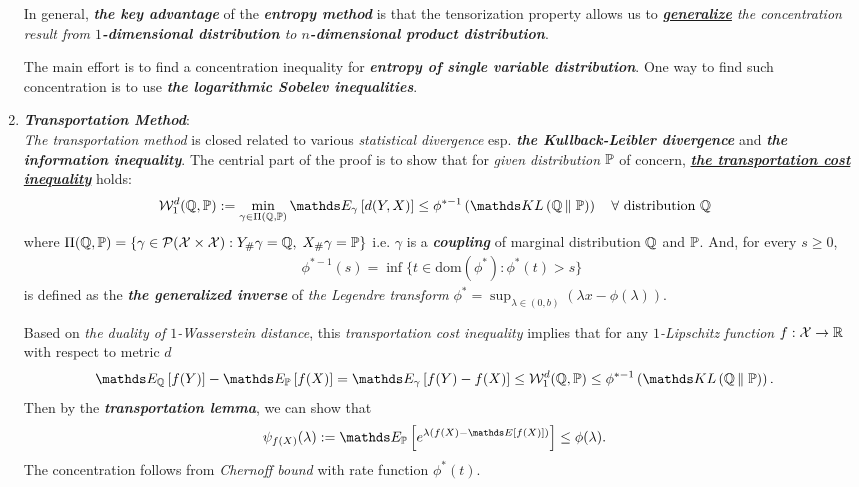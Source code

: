 \documentclass[11pt]{article}
\begin{document}
\begin{enumerate}
In general, \emph{\textbf{the key advantage}} of the \emph{\textbf{entropy method}} is that the tensorization property allows us to \emph{\underline{\textbf{generalize}} the concentration result from \textbf{$1$-dimensional distribution} to \textbf{$n$-dimensional product distribution}}. 

The main effort is to find a concentration inequality for \emph{\textbf{entropy of single variable distribution}}. One way to find such concentration is to use  \emph{\textbf{the logarithmic Sobelev inequalities}}.


\item \emph{\textbf{Transportation Method}}:\\
\emph{The transportation method} is closed related to various \emph{statistical divergence} esp. \emph{\textbf{the Kullback-Leibler divergence}} and \emph{\textbf{the information inequality}}. The centrial part of the proof is to show that for \emph{given distribution} ${\mathbb P}$ of concern, \underline{\emph{\textbf{the transportation cost inequality}}} holds:
\begin{align*}
\cW_{1}^{d}(\bQ, \bP) := \min_{\gamma \in \Pi(\bQ, \bP)}\E{\gamma}{d(Y, X)} &\le \phi^{*-1}\paren{\kl{\bQ}{\bP}} \quad \forall \text{ distribution } \bQ
\end{align*} where $\Pi({\mathbb Q}, {\mathbb P})= \left\{ \gamma \in {\mathcal P}({\mathcal X} \times {\mathcal X}):  Y_{\#}\gamma = {\mathbb Q}, \; X_{\#}\gamma = {\mathbb P} \right\}$ i.e. $\gamma$ is a \emph{\textbf{coupling}} of marginal distribution  ${\mathbb Q}$ and ${\mathbb P}$. And, for every $s \ge 0$, 
\begin{align*}
\phi^{*-1}(s) = \inf\{t \in \text{dom}(\phi^{*}): \phi^{*}(t) > s\}
\end{align*}  is defined as the \textbf{\emph{the generalized inverse}} of \emph{the Legendre transform} $\phi^{*}= \sup_{\lambda \in (0,b)}(\lambda x - \phi(\lambda))$. 

Based on \emph{the duality of $1$-Wasserstein distance}, this \emph{transportation cost inequality} implies that for any \emph{$1$-Lipschitz function} $f: {\mathcal X} \to {\mathbb R}$ with respect to metric $d$
\begin{align*}
\E{\bQ}{f(Y)} - \E{\bP}{f(X)} = \E{\gamma}{f(Y) - f(X)} &\le \cW_{1}^{d}(\bQ, \bP)  \le \phi^{*-1}\paren{\kl{\bQ}{\bP}}.
\end{align*} Then by the \emph{\textbf{transportation lemma}}, we can show that 
\begin{align*}
\psi_{f(X)}(\lambda) := \E{\bP}{e^{\lambda (f(X) - \E{}{f(X)})}} &\le \phi(\lambda).
\end{align*} The concentration follows from \emph{Chernoff bound} with rate function $\phi^{*}(t)$.


\end{enumerate}
\end{document}
